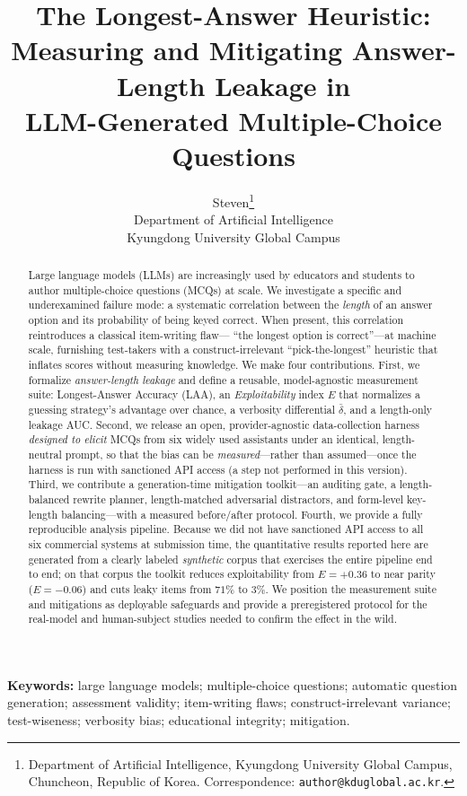 \documentclass[10pt,twocolumn]{article}
\title{\vspace{-1.4em}\bfseries The Longest-Answer Heuristic:\\
Measuring and Mitigating Answer-Length Leakage in\\
LLM-Generated Multiple-Choice Questions}
\author{%
Steven\thanks{Department of Artificial Intelligence, Kyungdong University
Global Campus, Chuncheon, Republic of Korea. Correspondence:
\texttt{author@kduglobal.ac.kr}.}\\
\small Department of Artificial Intelligence\\
\small Kyungdong University Global Campus
}
\date{}
\begin{document}
\maketitle

\begin{abstract}
\noindent
Large language models (LLMs) are increasingly used by educators and students
to author multiple-choice questions (MCQs) at scale. We investigate a
specific and underexamined failure mode: a systematic correlation between the
\emph{length} of an answer option and its probability of being keyed correct.
When present, this correlation reintroduces a classical item-writing flaw---
``the longest option is correct''---at machine scale, furnishing test-takers
with a construct-irrelevant ``pick-the-longest'' heuristic that inflates
scores without measuring knowledge. We make four contributions. First, we
formalize \emph{answer-length leakage} and define a reusable, model-agnostic
measurement suite: Longest-Answer Accuracy (LAA), an \emph{Exploitability}
index $E$ that normalizes a guessing strategy's advantage over chance, a
verbosity differential $\bar\delta$, and a length-only leakage AUC. Second, we
release an open, provider-agnostic data-collection harness \emph{designed to
elicit} MCQs from six widely used assistants under an identical, length-neutral
prompt, so that the bias can be \emph{measured}---rather than assumed---once the
harness is run with sanctioned API access (a step not performed in this version). Third, we contribute
a generation-time mitigation toolkit---an auditing gate, a length-balanced
rewrite planner, length-matched adversarial distractors, and form-level
key-length balancing---with a measured before/after protocol. Fourth, we
provide a fully reproducible analysis pipeline. Because we did not have
sanctioned API access to all six commercial systems at submission time, the
quantitative results reported here are generated from a clearly labeled
\emph{synthetic} corpus that exercises the entire pipeline end to end; on that
corpus the toolkit reduces exploitability from $E{=}{+}0.36$ to near parity
($E{=}{-}0.06$) and cuts leaky items from $71\%$ to $3\%$. We position the
measurement suite and mitigations as deployable safeguards and provide a
preregistered protocol for the real-model and human-subject studies needed to
confirm the effect in the wild.
\end{abstract}

\vspace{0.4em}
{\small\noindent\textbf{Keywords:} large language models; multiple-choice
questions; automatic question generation; assessment validity; item-writing
flaws; construct-irrelevant variance; test-wiseness; verbosity bias;
educational integrity; mitigation.}
\vspace{0.6em}
\end{document}

